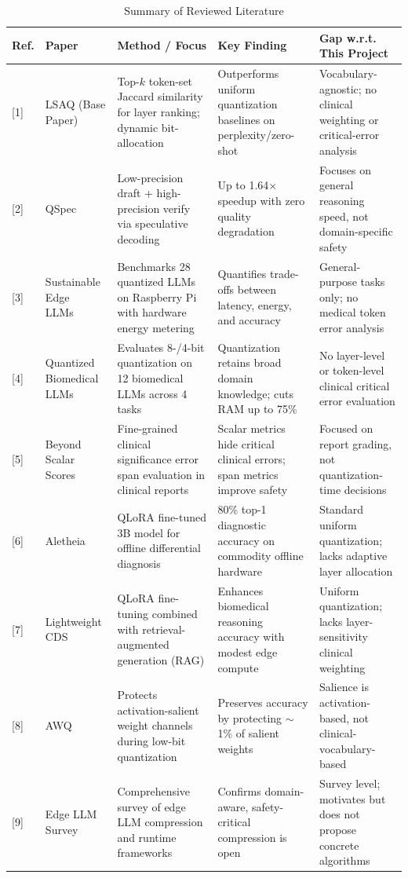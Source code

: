 \documentclass[conference]{IEEEtran}
\begin{document}
\begin{table}[t]
\centering
\caption{Summary of Reviewed Literature}
\label{tab:literature}
\renewcommand{\arraystretch}{1.3}
\footnotesize
\begin{tabularx}{\textwidth}{p{0.8cm}p{3.2cm}p{4.2cm}p{3.8cm}X}
\toprule
\textbf{Ref.} & \textbf{Paper} & \textbf{Method / Focus} & \textbf{Key Finding} & \textbf{Gap w.r.t. This Project} \\
\midrule
{[1]} & LSAQ (Base Paper)~\cite{zeng2024lsaq} & Top-$k$ token-set Jaccard similarity for layer ranking; dynamic bit-allocation & Outperforms uniform quantization baselines on perplexity/zero-shot & Vocabulary-agnostic; no clinical weighting or critical-error analysis \\
\hline
{[2]} & QSpec~\cite{zhao2025qspec} & Low-precision draft + high-precision verify via speculative decoding & Up to 1.64$\times$ speedup with zero quality degradation & Focuses on general reasoning speed, not domain-specific safety \\
\hline
{[3]} & Sustainable Edge LLMs~\cite{husom2025sustainable} & Benchmarks 28 quantized LLMs on Raspberry Pi with hardware energy metering & Quantifies trade-offs between latency, energy, and accuracy & General-purpose tasks only; no medical token error analysis \\
\hline
{[4]} & Quantized Biomedical LLMs~\cite{zhan2025quantized} & Evaluates 8-/4-bit quantization on 12 biomedical LLMs across 4 tasks & Quantization retains broad domain knowledge; cuts RAM up to 75\% & No layer-level or token-level clinical critical error evaluation \\
\hline
{[5]} & Beyond Scalar Scores~\cite{lu2026beyond} & Fine-grained clinical significance error span evaluation in clinical reports & Scalar metrics hide critical clinical errors; span metrics improve safety & Focused on report grading, not quantization-time decisions \\
\hline
{[6]} & Aletheia~\cite{walusimbi2026aletheia} & QLoRA fine-tuned 3B model for offline differential diagnosis & 80\% top-1 diagnostic accuracy on commodity offline hardware & Standard uniform quantization; lacks adaptive layer allocation \\
\hline
{[7]} & Lightweight CDS~\cite{ansari2025lightweight} & QLoRA fine-tuning combined with retrieval-augmented generation (RAG) & Enhances biomedical reasoning accuracy with modest edge compute & Uniform quantization; lacks layer-sensitivity clinical weighting \\
\hline
{[8]} & AWQ~\cite{lin2024awq} & Protects activation-salient weight channels during low-bit quantization & Preserves accuracy by protecting $\sim$1\% of salient weights & Salience is activation-based, not clinical-vocabulary-based \\
\hline
{[9]} & Edge LLM Survey~\cite{zheng2024review} & Comprehensive survey of edge LLM compression and runtime frameworks & Confirms domain-aware, safety-critical compression is open & Survey level; motivates but does not propose concrete algorithms \\
\bottomrule
\end{tabularx}
\end{table}
\end{document}
